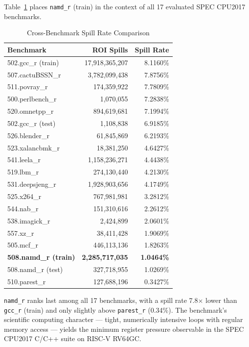 \documentclass[conference]{IEEEtran}
\begin{document}
Table~\ref{tab:compare} places \texttt{namd\_r} (train) in the
context of all 17 evaluated SPEC CPU2017 benchmarks.

\begin{table}[H]
\centering
\caption{Cross-Benchmark Spill Rate Comparison}
\label{tab:compare}
\begin{tabular}{lrr}
\toprule
\textbf{Benchmark} & \textbf{ROI Spills} & \textbf{Spill Rate} \\
\midrule
502.gcc\_r (train)  & 17,918,365,207 & 8.1160\% \\
507.cactuBSSN\_r    &  3,782,099,438 & 7.8756\% \\
511.povray\_r       &    174,359,922 & 7.7809\% \\
500.perlbench\_r    &      1,070,055 & 7.2838\% \\
520.omnetpp\_r      &    894,619,681 & 7.1994\% \\
502.gcc\_r (test)   &      1,108,838 & 6.9185\% \\
526.blender\_r      &     61,845,869 & 6.2193\% \\
523.xalancbmk\_r    &     18,381,250 & 4.6427\% \\
541.leela\_r        &  1,158,236,271 & 4.4438\% \\
519.lbm\_r          &    274,130,440 & 4.2130\% \\
531.deepsjeng\_r    &  1,928,903,656 & 4.1749\% \\
525.x264\_r         &    767,981,981 & 3.2812\% \\
544.nab\_r          &    151,310,616 & 2.2612\% \\
538.imagick\_r      &      2,424,899 & 2.0601\% \\
557.xz\_r           &     38,411,428 & 1.9069\% \\
505.mcf\_r          &    446,113,136 & 1.8263\% \\
\textbf{508.namd\_r (train)} & \textbf{2,285,717,035} & \textbf{1.0464\%} \\
508.namd\_r (test)  &    327,718,955 & 1.0269\% \\
510.parest\_r       &    127,688,196 & 0.3427\% \\
\bottomrule
\end{tabular}
\end{table}

\texttt{namd\_r} ranks last among all 17 benchmarks, with a spill
rate 7.8$\times$ lower than \texttt{gcc\_r} (train) and only slightly
above \texttt{parest\_r} (0.34\%). The benchmark's scientific
computing character --- tight, numerically intensive loops with
regular memory access --- yields the minimum register pressure
observable in the SPEC CPU2017 C/C++ suite on RISC-V RV64GC.
\end{document}
